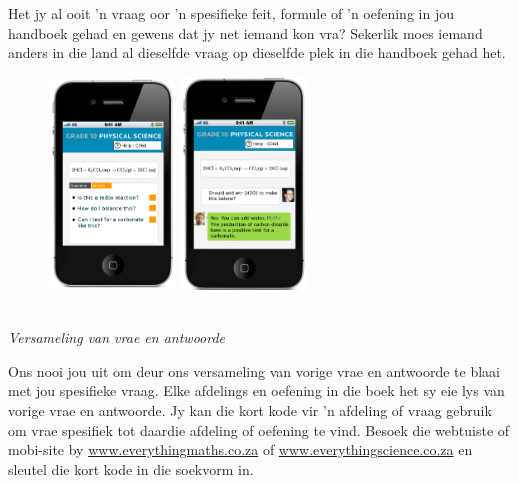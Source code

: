 {\normalsize

Het jy al ooit ’n vraag oor 'n spesifieke feit, formule of ’n oefening in jou handboek gehad en gewens
dat jy net iemand kon vra? Sekerlik moes iemand anders in die land al dieselfde vraag op dieselfde plek
in die handboek gehad het.

\begin{figure}[h]
\centering
\includegraphics[width=0.3\textwidth]{title_images/QADatabase2.png}
\includegraphics[width=0.3\textwidth]{title_images/AskaQuestions3.png}
\end{figure}

\vspace{0.7cm}\\
{\normalfont\sffamily\fontsize{16}\normalfont\itshape Versameling van vrae en antwoorde} \par
Ons nooi jou uit om deur ons versameling van vorige vrae en antwoorde te blaai met jou spesifieke
vraag. Elke afdelings en oefening in die boek het sy eie lys van vorige vrae en antwoorde. Jy kan die
kort kode vir 'n afdeling of vraag gebruik om vrae spesifiek tot daardie afdeling of oefening te vind.
Besoek die webtuiste of mobi-site by \underline{www.everythingmaths.co.za} of \underline{www.everythingscience.co.za} en
sleutel die kort kode in die soekvorm in.
\par

}

